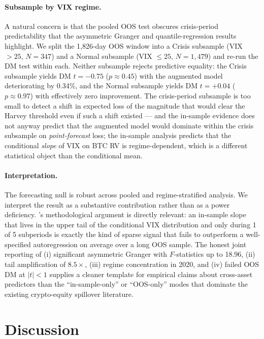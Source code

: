 \documentclass[11pt,a4paper]{article}
\begin{document}
\paragraph{Subsample by VIX regime.} A natural concern is that the pooled OOS test obscures crisis-period predictability that the asymmetric Granger and quantile-regression results highlight. We split the 1{,}826-day OOS window into a Crisis subsample (VIX $> 25$, $N = 347$) and a Normal subsample (VIX $\le 25$, $N = 1{,}479$) and re-run the DM test within each. Neither subsample rejects predictive equality: the Crisis subsample yields DM $t = -0.75$ ($p \approx 0.45$) with the augmented model deteriorating by 0.34\%, and the Normal subsample yields DM $t = +0.04$ ($p \approx 0.97$) with effectively zero improvement.%
 The crisis-period subsample is too small to detect a shift in expected loss of the magnitude that would clear the Harvey threshold even if such a shift existed --- and the in-sample evidence does not anyway predict that the augmented model would dominate within the crisis subsample on \emph{point-forecast} loss; the in-sample analysis predicts that the conditional \emph{slope} of VIX on BTC RV is regime-dependent, which is a different statistical object than the conditional mean.

\paragraph{Interpretation.} The forecasting null is robust across pooled and regime-stratified analysis. We interpret the result as a substantive contribution rather than as a power deficiency. \citet{conrad2020}'s methodological argument is directly relevant: an in-sample slope that lives in the upper tail of the conditional VIX distribution and only during 1 of 5 subperiods is exactly the kind of sparse signal that fails to outperform a well-specified autoregression on average over a long OOS sample. The honest joint reporting of (i) significant asymmetric Granger with $F$-statistics up to 18.96, (ii) tail amplification of $8.5\times$, (iii) regime concentration in 2020, and (iv) failed OOS DM at $|t| < 1$ supplies a cleaner template for empirical claims about cross-asset predictors than the ``in-sample-only'' or ``OOS-only'' modes that dominate the existing crypto-equity spillover literature.

\section{Discussion}
\label{sec:discussion}
\end{document}
